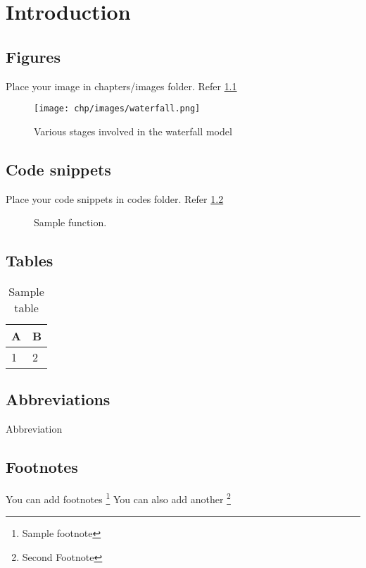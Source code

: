 \chapter{Introduction}

\section{Figures}

Place your image in chapters/images folder. Refer \ref{fig:waterfall}
\begin{figure}
	\centering
	\texttt{[image: chp/images/waterfall.png]}
	\caption{Various stages involved in the waterfall model}
	\label{fig:waterfall}
\end{figure}

\section{Code snippets}
Place your code snippets in codes folder. Refer \ref{fig:sample_code} 
\begin{figure}
	
	\caption{Sample function.}
	\label{fig:sample_code}
\end{figure}

\section{Tables}
\begin{table}[h!]
	\centering
	\begin{tabular}{l|l}
		A & B \\
		\hline 
		1 & 2 
	\end{tabular}
	\caption{Sample table}
	\label{tab:highlights}
\end{table}

\section{Abbreviations}
Abbreviation

\section{Footnotes}
You can add footnotes \footnote{Sample footnote}
You can also add another \footnote{Second Footnote}

